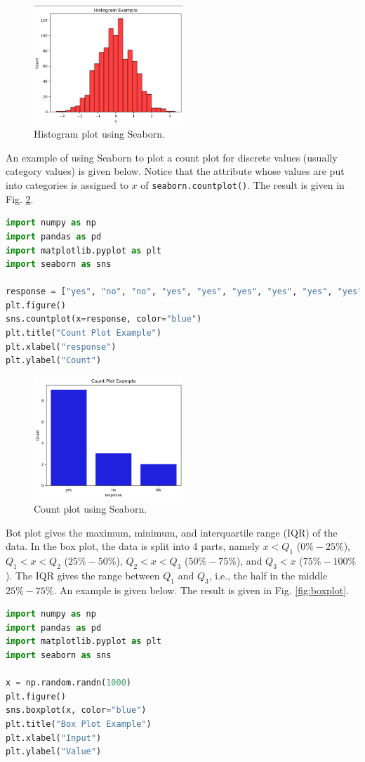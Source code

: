 \begin{figure}[htbp]
	\centering
	\includegraphics[width=0.5\textwidth]{chapters/part-3/figures/normhistexp.png}
	\caption{Histogram plot using Seaborn.}
	\label{fig:normhistexp}
\end{figure}

An example of using Seaborn to plot a count plot for discrete values (usually category values) is given below. Notice that the attribute whose values are put into categories is assigned to $x$ of \verb|seaborn.countplot()|. The result is given in Fig. \ref{fig:countplot}.
\begin{lstlisting}[language=Python]
import numpy as np
import pandas as pd
import matplotlib.pyplot as plt
import seaborn as sns

response = ["yes", "no", "no", "yes", "yes", "yes", "yes", "yes", "yes", "no", "yes", "yes", "NA", "NA"]
plt.figure()
sns.countplot(x=response, color="blue")
plt.title("Count Plot Example")
plt.xlabel("response")
plt.ylabel("Count")
\end{lstlisting}

\begin{figure}[htbp]
	\centering
	\includegraphics[width=0.5\textwidth]{chapters/part-3/figures/countplotexp.png}
	\caption{Count plot using Seaborn.}
	\label{fig:countplot}
\end{figure}

Bot plot gives the maximum, minimum, and interquartile range (IQR) of the data. In the box plot, the data is split into 4 parts, namely $x<Q_1$ ($0\%-25\%$), $Q_1<x<Q_2$ ($25\%-50\%$), $Q_2<x<Q_3$ ($50\%-75\%$), and $Q_3<x$ ($75\%-100\%$). The IQR gives the range between $Q_1$ and $Q_3$, i.e., the half in the middle $25\%-75\%$. An example is given below. The result is given in Fig. \ref{fig:boxplot}.
\begin{lstlisting}[language=Python]
import numpy as np
import pandas as pd
import matplotlib.pyplot as plt
import seaborn as sns

x = np.random.randn(1000)
plt.figure()
sns.boxplot(x, color="blue")
plt.title("Box Plot Example")
plt.xlabel("Input")
plt.ylabel("Value")
\end{lstlisting}

